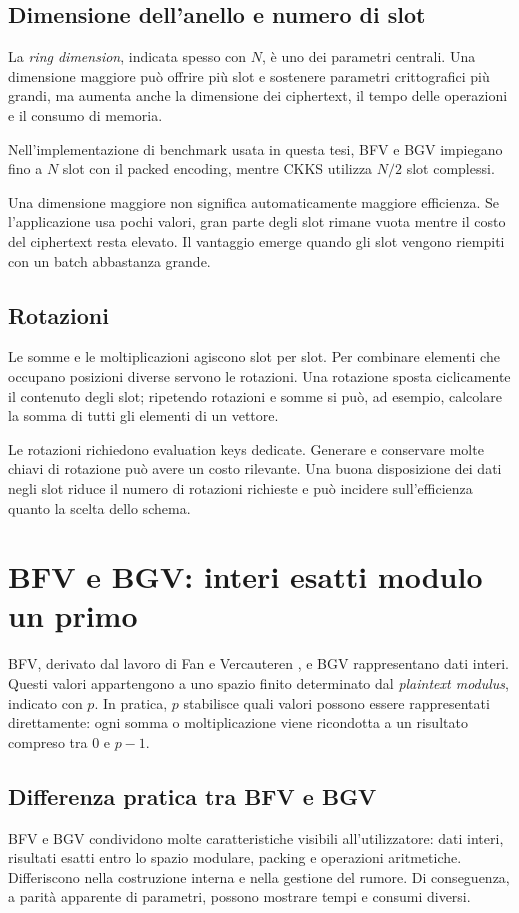 \subsection{Dimensione dell'anello e numero di slot}
La \emph{ring dimension}, indicata spesso con $N$, \`e uno dei parametri centrali. Una dimensione maggiore pu\`o offrire pi\`u slot e sostenere parametri crittografici pi\`u grandi, ma aumenta anche la dimensione dei ciphertext, il tempo delle operazioni e il consumo di memoria.

Nell'implementazione di benchmark usata in questa tesi, BFV e BGV impiegano fino a $N$ slot con il packed encoding, mentre CKKS utilizza $N/2$ slot complessi.

Una dimensione maggiore non significa automaticamente maggiore efficienza. Se l'applicazione usa pochi valori, gran parte degli slot rimane vuota mentre il costo del ciphertext resta elevato. Il vantaggio emerge quando gli slot vengono riempiti con un batch abbastanza grande.

\subsection{Rotazioni}
Le somme e le moltiplicazioni agiscono slot per slot. Per combinare elementi che occupano posizioni diverse servono le rotazioni. Una rotazione sposta ciclicamente il contenuto degli slot; ripetendo rotazioni e somme si pu\`o, ad esempio, calcolare la somma di tutti gli elementi di un vettore.

Le rotazioni richiedono evaluation keys dedicate. Generare e conservare molte chiavi di rotazione pu\`o avere un costo rilevante. Una buona disposizione dei dati negli slot riduce il numero di rotazioni richieste e pu\`o incidere sull'efficienza quanto la scelta dello schema.

\section{BFV e BGV: interi esatti modulo un primo}
BFV, derivato dal lavoro di Fan e Vercauteren \cite{bfv}, e BGV \cite{bgv} rappresentano dati interi. Questi valori appartengono a uno spazio finito determinato dal \emph{plaintext modulus}, indicato con $p$. In pratica, $p$ stabilisce quali valori possono essere rappresentati direttamente: ogni somma o moltiplicazione viene ricondotta a un risultato compreso tra $0$ e $p-1$.

\subsection{Differenza pratica tra BFV e BGV}
BFV e BGV condividono molte caratteristiche visibili all'utilizzatore: dati interi, risultati esatti entro lo spazio modulare, packing e operazioni aritmetiche. Differiscono nella costruzione interna e nella gestione del rumore. Di conseguenza, a parit\`a apparente di parametri, possono mostrare tempi e consumi diversi.

